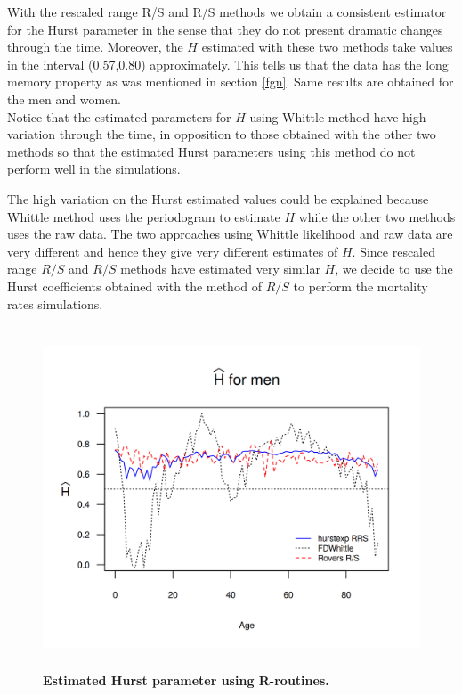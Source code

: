 \documentclass[12pt,reqno]{amsart}
\theoremstyle{definition}
\theoremstyle{remark}
\numberwithin{equation}{section}
\begin{document}
With the rescaled range R/S and R/S  methods we obtain a consistent estimator for the Hurst
parameter in the sense that they do not present dramatic changes through the time. Moreover,
the $H$ estimated with these two methods take values in the interval
(0.57,0.80) approximately. This tells us that the data has the long memory property as
was mentioned in section \ref{fgn}. Same results are obtained for the men and women.\\


Notice that the estimated parameters for $H$ using Whittle method have high variation through the time, in opposition to those
obtained with the other two methods so that the estimated
Hurst parameters using this method do not perform well in the simulations.

 The high variation on the Hurst estimated values could be explained because Whittle method uses
the periodogram to estimate $H$ while the other two methods uses the raw data. The two approaches using Whittle likelihood and raw data are very different and hence they give very different estimates of $H$. Since rescaled range $R/S$ and $R/S$  methods have estimated very similar $H$, we decide to use the Hurst coefficients obtained with the
method of $R/S$ to perform the mortality rates simulations. \\

\begin{figure}[H]
\includegraphics[width = 4.5in, height=4in]{Hurst-Men.png}
\caption{\bf Estimated Hurst parameter using R-routines.}
\label{graph-Hurst_Est_Me}
\end{figure}\vspace*{0.1cm}
\end{document}
